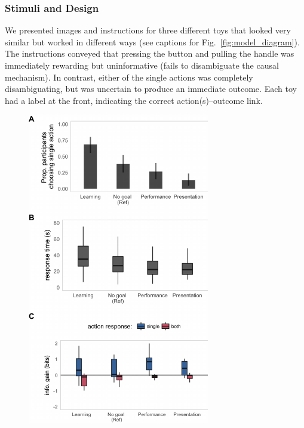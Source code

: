 \documentclass[10pt, letterpaper]{article}
\newenvironment{CodeChunk}{}{}
\begin{document}
\subsubsection{Stimuli and Design}\label{stimuli-and-design}

We presented images and instructions for three different toys that
looked very similar but worked in different ways (see captions for
Fig.~\ref{fig:model_diagram}). The instructions conveyed that pressing
the button and pulling the handle was immediately rewarding but
uninformative (fails to disambiguate the causal mechanism). In contrast,
either of the single actions was completely disambiguating, but was
uncertain to produce an immediate outcome. Each toy had a label at the
front, indicating the correct action(s)--outcome link.

\begin{CodeChunk}
\begin{figure}[H]

{\centering \includegraphics[width=0.85\linewidth]{figs/e1_behav_results_plot-1} 

}
\end{figure}
\end{CodeChunk}
\end{document}

